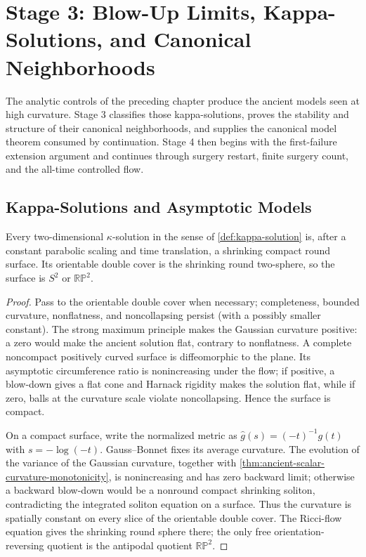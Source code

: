\chapter{Stage 3: Blow-Up Limits, Kappa-Solutions, and Canonical Neighborhoods}

The analytic controls of the preceding chapter produce the ancient models
seen at high curvature.  Stage 3 classifies those kappa-solutions, proves the
stability and structure of their canonical neighborhoods, and supplies the
canonical model theorem consumed by continuation.  Stage 4 then begins with
the first-failure extension argument and continues through surgery restart,
finite surgery count, and the all-time controlled flow.

\section{Kappa-Solutions and Asymptotic Models}

\begin{theorem}
\label{thm:two-dimensional-kappa-solutions-round}
\notready
Every two-dimensional $\kappa$-solution in the sense of
\ref{def:kappa-solution} is, after a constant parabolic scaling and time
translation, a shrinking compact round surface.  Its orientable double cover
is the shrinking round two-sphere, so the surface is $S^2$ or
$\mathbb{RP}^2$.
\end{theorem}

\begin{proof}
Pass to the orientable double cover when necessary; completeness, bounded
curvature, nonflatness, and noncollapsing persist (with a possibly smaller
constant).  The strong maximum principle makes the Gaussian curvature positive: a zero
would make the ancient solution flat, contrary to nonflatness.  A complete
noncompact positively curved surface is diffeomorphic to the plane.  Its
asymptotic circumference ratio is nonincreasing under the flow; if positive,
a blow-down gives a flat cone and Harnack rigidity makes the solution flat,
while if zero, balls at the curvature scale violate noncollapsing.  Hence the
surface is compact.

On a compact surface, write the normalized metric as
$\widehat g(s)=(-t)^{-1}g(t)$ with $s=-\log(-t)$.  Gauss--Bonnet fixes its
average curvature.  The evolution of the variance of the Gaussian curvature,
together with \ref{thm:ancient-scalar-curvature-monotonicity}, is
nonincreasing and has zero backward limit; otherwise a backward blow-down
would be a nonround compact shrinking soliton, contradicting the integrated
soliton equation on a surface.  Thus the curvature is spatially constant on
every slice of the orientable double cover.  The Ricci-flow equation gives the
shrinking round sphere there; the only free orientation-reversing quotient is
the antipodal quotient $\mathbb{RP}^2$.
\end{proof}

